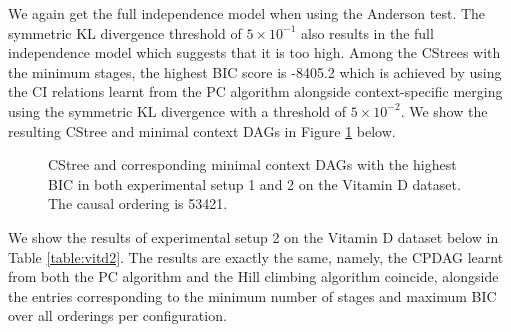 \documentclass{tufte-book}
\begin{document}
We again get the full independence model when using the Anderson test. The symmetric KL divergence threshold of \(5\times 10^{-1}\) also results in the full independence model which suggests that it is too high. Among the CStrees with the minimum stages, the highest BIC score is -8405.2 which is achieved by using the CI relations learnt from the PC algorithm alongside context-specific merging using the symmetric KL divergence with a threshold of \(5 \times 10^{-2}\). We show the resulting CStree and minimal context DAGs in Figure \ref{fig:vitdmaxbic} below.

\begin{figure}[]\label{fig:vitdmaxbic}
   \begin{floatrow}
%
\caption{CStree and corresponding minimal context DAGs with the highest BIC in both experimental setup 1 and 2 on the Vitamin D dataset. The causal ordering is 53421. }
        
   \end{floatrow}
\end{figure}

We show the results of experimental setup 2 on the Vitamin D dataset below in Table \ref{table:vitd2}. The results are exactly the same, namely, the CPDAG learnt from both the PC algorithm and the Hill climbing algorithm coincide, alongside the entries corresponding to the minimum number of stages and maximum BIC over all orderings per configuration.
\end{document}

